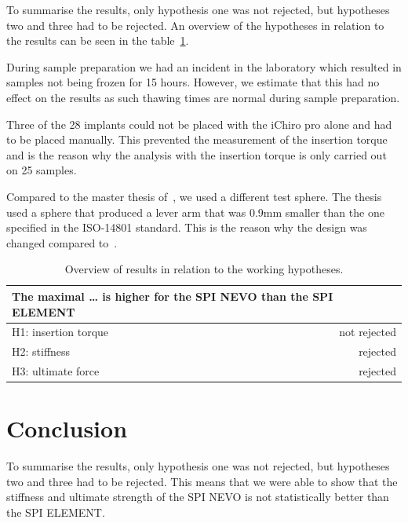 \documentclass[12pt, a4paper, twoside]{report}
\begin{document}

%
To summarise the results, only hypothesis one was not rejected, but hypotheses two and three had to be rejected.
An overview of the hypotheses in relation to the results can be seen in the table~\ref{tab:results_vs_h}.

During sample preparation we had an incident in the laboratory which resulted in samples not being frozen for 15 hours.
However, we estimate that this had no effect on the results as such thawing times are normal during sample preparation.

Three of the 28 implants could not be placed with the iChiro pro alone and had to be placed manually.
This prevented the measurement of the insertion torque and is the reason why the analysis with the insertion torque is only carried out on 25 samples.

Compared to the master thesis of~\cite{thierrin_primary_2022}, we used a different test sphere.
The thesis used a sphere that produced a lever arm that was 0.9mm smaller than the one specified in the ISO-14801 standard.
This is the reason why the design was changed compared to~\citet{thierrin_primary_2022}.

%
\begin{table}[H]
\centering
\begin{tabular}{|l|r|}
\hline
\multicolumn{2}{|l|}{The maximal … is higher for the SPI NEVO than the SPI ELEMENT} \\
\hline
H1: insertion torque & not rejected \\
\hline
\multicolumn{1}{|l|}{H2: stiffness} & rejected \\
\hline
H3: ultimate force & rejected \\
\hline
\end{tabular}
\caption{Overview of results in relation to the working hypotheses.}
\label{tab:results_vs_h}
\end{table}
%
%
\newpage
%
\section{Conclusion}
%
To summarise the results, only hypothesis one was not rejected, but hypotheses two and three had to be rejected.
This means that we were able to show that the stiffness and ultimate strength of the SPI NEVO is not statistically better than the SPI ELEMENT.
\end{document}
